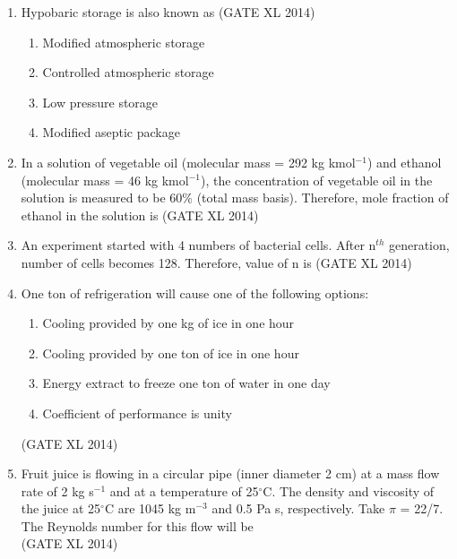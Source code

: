 \documentclass[journal,12pt,onecolumn]{IEEEtran}
\theoremstyle{remark}
\begin{document}
\begin{enumerate}
    \item Hypobaric storage is also known as \underline{\hspace{3cm}} 
    \hfill (GATE XL 2014)
    \begin{multicols}{2}
    \begin{enumerate}
        \item Modified atmospheric storage  
        \item Controlled atmospheric storage  
        \item Low pressure storage  
        \item Modified aseptic package  
    \end{enumerate}
    \end{multicols}
 

    \item In a solution of vegetable oil (molecular mass = 292 kg kmol$^{-1}$) and ethanol (molecular mass = 46 kg kmol$^{-1}$), the concentration of vegetable oil in the solution is measured to be 60\% (total mass basis). Therefore, mole fraction of ethanol in the solution is \underline{\hspace{3cm}}  
    \hfill (GATE XL 2014)\\

    \item An experiment started with 4 numbers of bacterial cells. After n$^{th}$ generation, number of cells becomes 128. Therefore, value of n is \underline{\hspace{3cm}}  
    \hfill (GATE XL 2014)\\

    \item One ton of refrigeration will cause one of the following options:  
    \begin{multicols}{2}
    \begin{enumerate}
        \item Cooling provided by one kg of ice in one hour  
        \item Cooling provided by one ton of ice in one hour  
        \item Energy extract to freeze one ton of water in one day  
        \item Coefficient of performance is unity  
    \end{enumerate}
    \end{multicols}
    \hfill (GATE XL 2014)

    \item Fruit juice is flowing in a circular pipe (inner diameter 2 cm) at a mass flow rate of 2 kg s$^{-1}$ and at a temperature of 25$^\circ$C. The density and viscosity of the juice at 25$^\circ$C are 1045 kg m$^{-3}$ and 0.5 Pa s, respectively. Take $\pi$ = 22/7. The Reynolds number for this flow will be \underline{\hspace{3cm}} \\
    \hfill (GATE XL 2014)\\


\end{enumerate}
\end{document}
